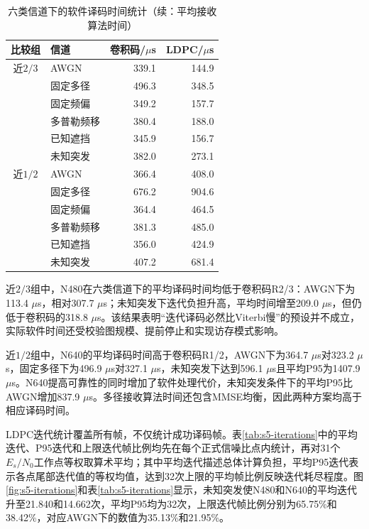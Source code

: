 \begin{table}[htbp]
  \ContinuedFloat
  \centering\small
  \caption[]{六类信道下的软件译码时间统计（续：平均接收算法时间）}
  \begin{tabular}{c l r r}
    \toprule
    比较组 & 信道 & 卷积码/$\mu$s & LDPC/$\mu$s\\
    \midrule
    近$2/3$ & AWGN & 339.1 & 144.9\\
     & 固定多径 & 496.3 & 348.5\\
     & 固定频偏 & 349.2 & 157.7\\
     & 多普勒频移 & 380.4 & 188.0\\
     & 已知遮挡 & 345.9 & 156.7\\
     & 未知突发 & 382.0 & 273.1\\
    \midrule
    近$1/2$ & AWGN & 366.4 & 408.0\\
     & 固定多径 & 676.2 & 904.6\\
     & 固定频偏 & 364.4 & 464.5\\
     & 多普勒频移 & 381.3 & 485.0\\
     & 已知遮挡 & 356.0 & 424.9\\
     & 未知突发 & 407.2 & 681.4\\
    \bottomrule
  \end{tabular}
\end{table}

近$2/3$组中，N480在六类信道下的平均译码时间均低于卷积码R2/3：AWGN下为113.4 $\mu$s，相对307.7 $\mu$s；未知突发下迭代负担升高，平均时间增至209.0 $\mu$s，但仍低于卷积码的318.8 $\mu$s。该结果表明“迭代译码必然比Viterbi慢”的预设并不成立，实际软件时间还受校验图规模、提前停止和实现访存模式影响。

近$1/2$组中，N640的平均译码时间高于卷积码R1/2，AWGN下为364.7 $\mu$s对323.2 $\mu$s，固定多径下为496.9 $\mu$s对327.1 $\mu$s，未知突发下达到596.1 $\mu$s且平均P95为1407.9 $\mu$s。N640提高可靠性的同时增加了软件处理代价，未知突发条件下的平均P95比AWGN增加837.9 $\mu$s。多径接收算法时间还包含MMSE均衡，因此两种方案均高于相应译码时间。

LDPC迭代统计覆盖所有帧，不仅统计成功译码帧。表\ref{tab:s5-iterations}中的平均迭代、P95迭代和上限迭代帧比例均先在每个正式信噪比点内统计，再对31个$E_s/N_0$工作点等权取算术平均；其中平均迭代描述总体计算负担，平均P95迭代表示各点尾部迭代值的等权均值，达到32次上限的平均帧比例反映迭代耗尽程度。图\ref{fig:s5-iterations}和表\ref{tab:s5-iterations}显示，未知突发使N480和N640的平均迭代升至21.840和14.662次，平均P95均为32次，上限迭代帧比例分别为65.75\%和38.42\%，对应AWGN下的数值为35.13\%和21.95\%。

